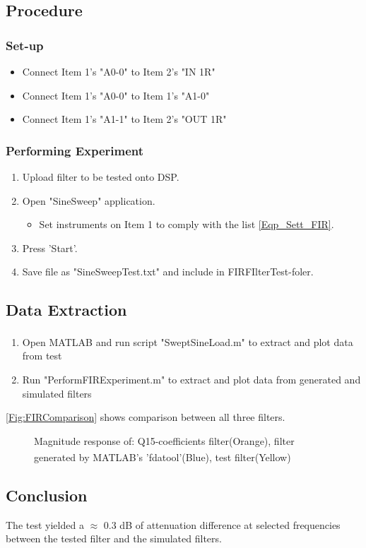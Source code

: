 \subsection{Procedure}
\subsubsection{Set-up}
	\begin{itemize}
		\item Connect Item 1's "A0-0" to Item 2's "IN 1R"
		\item Connect Item 1's "A0-0" to Item 1's "A1-0"
		\item Connect Item 1's "A1-1" to Item 2's "OUT 1R"
	\end{itemize}

\subsubsection{Performing Experiment}
	\begin{enumerate}
		\item Upload filter to be tested onto DSP.
		\item Open "SineSweep" application.
		\begin{itemize}
			 \item Set instruments on Item 1 to comply with the list \autoref{Eqp_Sett_FIR}.
		\end{itemize}
		\item Press 'Start'.
		\item Save file as "SineSweepTest.txt" and include in FIRFIlterTest-foler.
	\end{enumerate}


\subsection{Data Extraction}
	\begin{enumerate}
		\item Open MATLAB\textsuperscript{\textregistered} and run script "SweptSineLoad.m" to extract and plot data from test
		\item Run "PerformFIRExperiment.m" to extract and plot data from generated and simulated filters
	\end{enumerate}

\autoref{Fig:FIRComparison} shows comparison between all three filters.
	
\begin{figure}[H]
	\centering
	
	\caption{Magnitude response of: Q15-coefficients filter(Orange), filter generated by MATLAB\textsuperscript{\textregistered}'s 'fdatool'(Blue), test filter(Yellow)}
	\label{Fig:FIRComparison}
\end{figure}

\subsection{Conclusion}
The test yielded a $\approx$ 0.3 dB of attenuation difference  at selected frequencies between the tested filter and the simulated filters.



